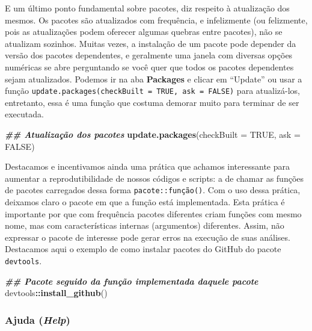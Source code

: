 \documentclass[
]{article}
\newenvironment{Shaded}{\begin{snugshade}}{\end{snugshade}}
\newcommand{\AttributeTok}[1]{\textcolor[rgb]{0.13,0.29,0.53}{#1}}
\newcommand{\ConstantTok}[1]{\textcolor[rgb]{0.56,0.35,0.01}{#1}}
\newcommand{\DocumentationTok}[1]{\textcolor[rgb]{0.56,0.35,0.01}{\textbf{\textit{#1}}}}
\newcommand{\FunctionTok}[1]{\textcolor[rgb]{0.13,0.29,0.53}{\textbf{#1}}}
\newcommand{\NormalTok}[1]{#1}
\newcommand{\SpecialCharTok}[1]{\textcolor[rgb]{0.81,0.36,0.00}{\textbf{#1}}}
\begin{document}
E um último ponto fundamental sobre pacotes, diz respeito à atualização dos mesmos. Os pacotes são atualizados com frequência, e infelizmente (ou felizmente, pois as atualizações podem oferecer algumas quebras entre pacotes), não se atualizam sozinhos. Muitas vezes, a instalação de um pacote pode depender da versão dos pacotes dependentes, e geralmente uma janela com diversas opções numéricas se abre perguntando se você quer que todos os pacotes dependentes sejam atualizados. Podemos ir na aba \textbf{Packages} e clicar em ``Update'' ou usar a função \texttt{update.packages(checkBuilt\ =\ TRUE,\ ask\ =\ FALSE)} para atualizá-los, entretanto, essa é uma função que costuma demorar muito para terminar de ser executada.

\begin{Shaded}
\begin{Highlighting}[]
\DocumentationTok{\#\# Atualização dos pacotes}
\FunctionTok{update.packages}\NormalTok{(}\AttributeTok{checkBuilt =} \ConstantTok{TRUE}\NormalTok{, }\AttributeTok{ask =} \ConstantTok{FALSE}\NormalTok{)}
\end{Highlighting}
\end{Shaded}

Destacamos e incentivamos ainda uma prática que achamos interessante para aumentar a reprodutibilidade de nossos códigos e scripts: a de chamar as funções de pacotes carregados dessa forma \texttt{pacote::função()}. Com o uso dessa prática, deixamos claro o pacote em que a função está implementada. Esta prática é importante por que com frequência pacotes diferentes criam funções com mesmo nome, mas com características internas (argumentos) diferentes. Assim, não expressar o pacote de interesse pode gerar erros na execução de suas análises. Destacamos aqui o exemplo de como instalar pacotes do GitHub do pacote \texttt{devtools}.

\begin{Shaded}
\begin{Highlighting}[]
\DocumentationTok{\#\# Pacote seguido da função implementada daquele pacote}
\NormalTok{devtools}\SpecialCharTok{::}\FunctionTok{install\_github}\NormalTok{()}
\end{Highlighting}
\end{Shaded}

\hypertarget{ajuda-help}{%
\subsubsection{\texorpdfstring{Ajuda (\emph{Help})}{Ajuda (Help)}}\label{ajuda-help}}
\end{document}
